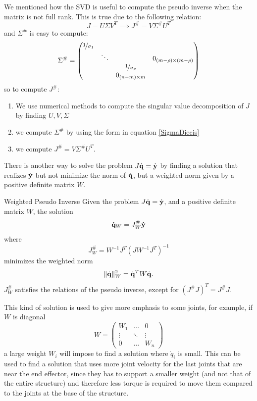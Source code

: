 \documentclass[10pt, a4paper]{report}
\begin{document}
We mentioned how the SVD is useful to compute the pseudo inverse when the matrix is not full rank. This is true due to the following relation:\begin{equation}
    J=U\Sigma V^T\implies J^\#=V\Sigma^\# U^T 
\end{equation}
and $\Sigma^\#$ is easy to compute:\begin{equation}\label{SigmaDiecis}
    \Sigma^\#=\begin{pmatrix}
        \nicefrac{1}{\sigma_1}& & &\\ 
        &\ddots &  & 0_{(m-\rho)\times (m-\rho)}\\ 
        & &  \nicefrac{1}{\sigma_\rho} &\\ 
         & &  0_{(n-m)\times m} &
    \end{pmatrix}
\end{equation}
so to compute $J^\#$:\begin{enumerate}
    \item We use numerical methods to compute the singular value decomposition of $J$ by finding $U,V,\Sigma$
    \item we compute $\Sigma^\#$ by using the form in equation \eqref{SigmaDiecis}
    \item we compute $J^\#=V\Sigma^\# U^T$.
\end{enumerate}

There is another way to solve the problem $J{\dot{\mathbf q}}={\dot{\mathbf y}}$ by finding a solution that realizes ${\dot{\mathbf y}}$ but not minimize the norm of ${\dot{\mathbf q}}$, but a weighted norm given by a positive definite matrix $W$.
\begin{boxdefinition}{Weighted Pseudo Inverse}{}
    Given the problem $J{\dot{\mathbf q}}={\dot{\mathbf y}}$, and a positive definite matrix $W$, the solution \begin{equation}
        {\dot{\mathbf q}}_W=J^\#_W{\dot{\mathbf y}}
    \end{equation}
    where\begin{equation}
        J^\#_W=W^{-1}J^T(JW^{-1}J^T)^{-1}
    \end{equation}
    minimizes the weighted norm\begin{equation}
        \|{\dot{\mathbf q}}\|^2_W={\dot{\mathbf q}}^TW{\dot{\mathbf q}}.
    \end{equation}
    $J^\#_W$ satisfies the relations of the pseudo inverse, except for $(J^\#J)^T=J^\#J$.
\end{boxdefinition}
\noindent This kind of solution is used to give more emphasis to some joints, for example, if $W$ is diagonal\begin{equation}
    W=\begin{pmatrix}
        W_1&\dots & 0\\ 
        \vdots &\ddots&\vdots \\ 
        0&\dots & W_n
    \end{pmatrix}
\end{equation}
a large weight $W_i$ will impose to find a solution where $\dot q_i$ is small. This can be used to find a solution that uses more joint velocity for the last joints that are near the end effector, since they has to support a smaller weight (and not that of the entire structure) and therefore less torque is required to move them compared to the joints at the base of the structure.\bigskip
\end{document}

